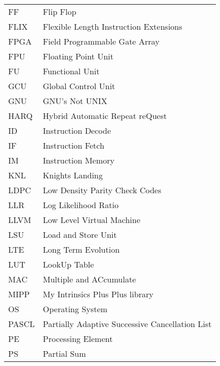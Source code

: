 \begin{center}
\begin{longtable}{ p{}  p{} }
FF        & Flip Flop                                              \\
FLIX      & Flexible Length Instruction Extensions                 \\
FPGA      & Field Programmable Gate Array                          \\
FPU       & Floating Point Unit                                    \\
FU        & Functional Unit                                        \\
GCU       & Global Control Unit                                    \\
GNU       & GNU’s Not UNIX                                         \\
HARQ      & Hybrid Automatic Repeat reQuest                        \\
ID        & Instruction Decode                                     \\
IF        & Instruction Fetch                                      \\
IM        & Instruction Memory                                     \\
KNL       & Knights Landing                                        \\
LDPC      & Low Density Parity Check Codes                         \\
LLR       & Log Likelihood Ratio                                   \\
LLVM      & Low Level Virtual Machine                              \\
LSU       & Load and Store Unit                                    \\
LTE       & Long Term Evolution                                    \\
LUT       & LookUp Table                                           \\
MAC       & Multiple and ACcumulate                                \\
MIPP      & My Intrinsics Plus Plus library                        \\
OS        & Operating System                                       \\
PASCL     & Partially Adaptive Successive Cancellation List        \\
PE        & Processing Element                                     \\
PS        & Partial Sum                                            \\

\end{longtable}
\end{center}
